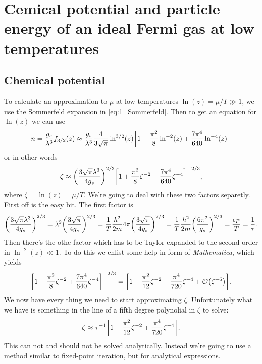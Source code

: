 \documentclass[11pt,letter, swedish, english
]{article}
\renewcommand{\thesubsection}{\arabic{section} (\alph{subsection})}
\begin{document}
\section{Cemical potential and particle energy of an ideal
  Fermi gas at low temperatures}
\renewcommand{\thesubsection}{\arabic{section} (\roman{subsection})}
\subsection{Chemical potential}
To calculate an approximation to $\mu$ at low temperatures
$\ln(z)=\mu/T\gg1$, we use the Sommerfeld expansion in
\eqref{eq:1_Sommerfeld}. 
Then to get an equation for $\ln(z)$ we can use
\begin{equation}
n=\frac{g_s}{\lambda^3}f_{3/2}(z)
\approx\frac{g_s}{\lambda^3}
\frac{4}{3\sqrt{\pi}}\ln^{3/2}(z)
\qty[1+\frac{\pi^2}{8}\ln^{-2}(z) 
+\frac{7\pi^4}{640}\ln^{-4}(z) ]
\end{equation}
or in other words
\begin{equation}
\zeta\approx\qty(\frac{3\sqrt{\pi}\lambda^3}{4g_s})^{2/3}
\qty[1+\frac{\pi^2}{8}\zeta^{-2}
+\frac{7\pi^4}{640}\zeta^{-4} ]^{-2/3},
\end{equation}
where $\zeta=\ln(z)=\mu/T$.
We're going to deal with these two factors separetly.
First off is the easy bit. The first factor is
\begin{equation}
\qty(\frac{3\sqrt{\pi}\lambda^3}{4g_s})^{2/3}
=\lambda^2\qty(\frac{3\sqrt{\pi}}{4g_s})^{2/3}
=\frac{1}{T}\frac{\hbar^2}{2m}4\pi\qty(\frac{3\sqrt{\pi}}{4g_s})^{2/3}
=\frac{1}{T}\frac{\hbar^2}{2m}\qty(\frac{6\pi^2}{g_s})^{2/3}
=\frac{\epsilon_F}{T}=\frac{1}{\tau}.
\end{equation}
Then there's the othe factor which has to be Taylor expanded to the
second order in $\ln^{-2}(z)\ll1$. To do this we enlist some help in
form of \emph{Mathematica}\footnotemark{}, which yields
\begin{equation}
\qty[1 + \frac{\pi^2}{8}\zeta^{-2}
 + \frac{7\pi^4}{640}\zeta^{-4}]^{-2/3} 
=\qty[1 - \frac{\pi^2}{12}\zeta^{-2}
 + \frac{\pi^4}{720}\zeta^{-4} + \order{\zeta^{-6}}].
\end{equation}
We now have every thing we need to start approximating $\zeta$.
Unfortunately what we have is something in the line of a fifth degree
polynolial in $\zeta$ to solve: 
\begin{equation}\label{eq:2_fixed-point}
\zeta\approx \tau^{-1}\qty[1 - \frac{\pi^2}{12}\zeta^{-2}
 + \frac{\pi^4}{720}\zeta^{-4}].
\end{equation}
This can not and should not be solved
analytically. Instead we're going to use a method similar to
fixed-point iteration, but for analytical expressions.
\end{document}
